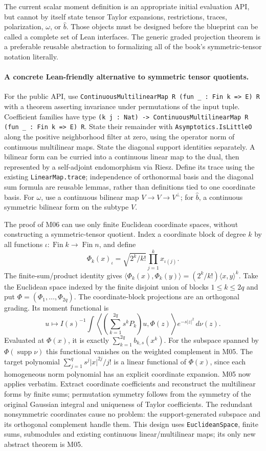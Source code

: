 The current scalar moment definition is an appropriate initial evaluation API,
but cannot by itself state tensor Taylor expansions, restrictions, traces,
polarization, $\omega$, or $\widehat b$. Those objects must be designed before
the blueprint can be called a complete set of Lean interfaces. The generic
graded projection theorem is a preferable reusable abstraction to formalizing
all of the book's symmetric-tensor notation literally.

\paragraph{A concrete Lean-friendly alternative to symmetric tensor quotients.}
For the public API, use
\texttt{ContinuousMultilinearMap R (fun \_ : Fin k => E) R}
with a theorem asserting invariance under permutations of the input tuple.
Coefficient families have type
\texttt{(k j : Nat) -> ContinuousMultilinearMap R (fun \_ : Fin k => E) R}.
State their remainder with \texttt{Asymptotics.IsLittleO} along the positive
neighborhood filter at zero, using the operator norm of continuous multilinear
maps. State the diagonal support identities separately. A bilinear form can be
curried into a continuous linear map to the dual, then represented by a
self-adjoint endomorphism via Riesz. Define its trace using the existing
\texttt{LinearMap.trace}; independence of orthonormal basis and the diagonal
sum formula are reusable lemmas, rather than definitions tied to one coordinate
basis. For $\omega$, use a continuous bilinear map
$V\to V\to V^\perp$; for $\widehat b$, a continuous symmetric bilinear form
on the subtype $V$.

The proof of M06 can use only finite Euclidean coordinate spaces, without
constructing a symmetric-tensor quotient. Index a coordinate block of degree
$k$ by all functions $\iota:\operatorname{Fin}k\to\operatorname{Fin}n$, and
define
\[
 \Phi_k(x)_\iota=\sqrt{2^k/k!}\prod_{j=1}^k x_{\iota(j)}.
\]
The finite-sum/product identity gives
$\langle\Phi_k(x),\Phi_k(y)\rangle=(2^k/k!)\langle x,y\rangle^k$.
Take the Euclidean space indexed by the finite disjoint union of blocks
$1\leq k\leq2q$ and put $\Phi=(\Phi_1,\ldots,\Phi_{2q})$.
The coordinate-block projections are an orthogonal grading. Its moment
functional is
\[
 u\longmapsto I(s)^{-1}\int
 \left\langle\left(\sum_{k=1}^{2q}s^kP_k\right)u,\Phi(z)\right\rangle
 e^{-s|z|^2}\,d\nu(z).
\]
Evaluated at $\Phi(x)$, it is exactly $\sum_{k=1}^{2q}b_{k,s}(x^k)$.
For the subspace spanned by $\Phi(\operatorname{supp}\nu)$ this functional
vanishes on the weighted complement in M05. The target polynomial
$\sum_{j=1}^q s^j|x|^{2j}/j!$ is a linear functional of $\Phi(x)$, since each
homogeneous norm polynomial has an explicit coordinate expansion. M05 now
applies verbatim. Extract coordinate coefficients and reconstruct the
multilinear forms by finite sums; permutation symmetry follows from the
symmetry of the original Gaussian integral and uniqueness of Taylor
coefficients. The redundant nonsymmetric coordinates cause no problem: the
support-generated subspace and its orthogonal complement handle them.
This design uses \texttt{EuclideanSpace}, finite sums, submodules and existing
continuous linear/multilinear maps; its only new abstract theorem is M05.

